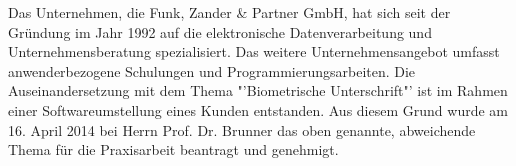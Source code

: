 Das Unternehmen, die Funk, Zander \& Partner GmbH, hat sich seit der Gründung im Jahr 1992 auf die elektronische Datenverarbeitung und Unternehmensberatung spezialisiert. Das weitere Unternehmensangebot umfasst anwenderbezogene Schulungen und Programmierungsarbeiten. Die Auseinandersetzung mit dem Thema "'Biometrische Unterschrift"' ist im Rahmen einer Softwareumstellung eines Kunden entstanden. Aus diesem Grund wurde am 16. April 2014 bei Herrn Prof. Dr. Brunner das oben genannte, abweichende Thema für die Praxisarbeit beantragt und genehmigt.
